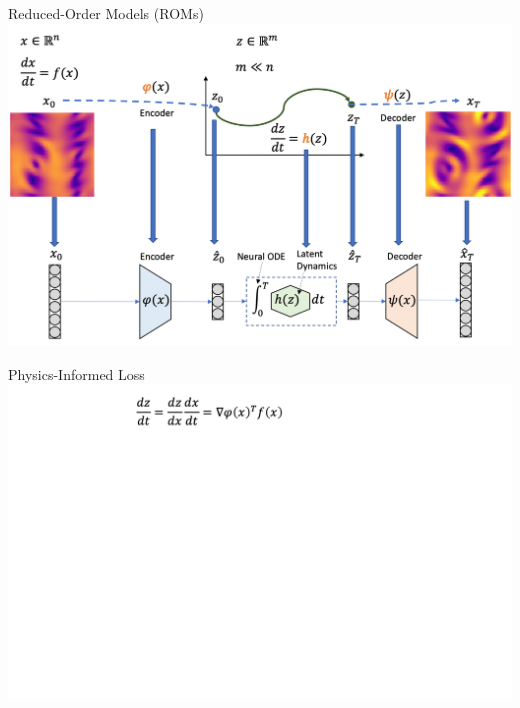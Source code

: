 \documentclass[8pt]{beamer}
\begin{document}
\begin{frame}{Reduced-Order Models (ROMs)}
\includegraphics[width=\textwidth]{Figures/roms_4}
\end{frame}

\begin{frame}{Physics-Informed Loss}
\includegraphics[width=\textwidth]{Figures/collocations_1.png}
\end{frame}
\end{document}
